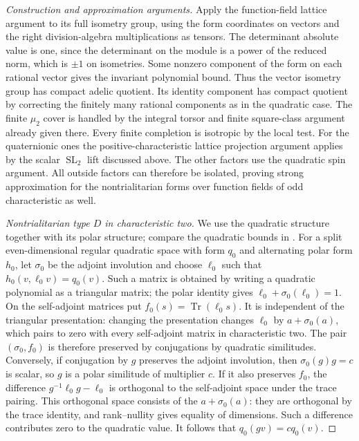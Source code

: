 \documentclass[11pt,a4paper,openany,oneside]{book}
\theoremstyle{resultstyle}
\theoremstyle{definition}
\numberwithin{equation}{chapter}
\begin{document}
\begin{proof}[Construction and approximation arguments]
Apply the function-field lattice
argument to its full isometry
group, using the form coordinates
on vectors and the right
division-algebra multiplications
as tensors. The determinant
absolute value is one, since
the determinant on the module
is a power of the reduced norm,
which is \(\pm1\) on isometries.
Some nonzero component of the
form on each rational vector
gives the invariant polynomial
bound. Thus the vector isometry
group has compact adelic quotient.
Its identity component has
compact quotient by correcting
the finitely many rational
components as in the quadratic
case. The finite \(\mu_2\)
cover is handled by the integral
torsor and finite square-class
argument already given there.
Every finite completion is
isotropic by the local test.
For the quaternionic ones
the positive-characteristic
lattice projection argument
applies by the scalar
\(\operatorname{SL}_2\) lift discussed
above. The other factors use
the quadratic spin argument.
All outside factors can
therefore be isolated, proving
strong approximation for the
nontrialitarian forms over
function fields of odd
characteristic as well.

\medskip\noindent
\textit{Nontrialitarian type \(D\) in characteristic two.}
We use the quadratic structure together with its polar structure;
compare the quadratic bounds in \cite[Corollary 6.8]{dolphinquadratic}. For a split
even-dimensional regular quadratic space with form \(q_0\) and alternating
polar form \(h_0\), let \(\sigma_0\) be the adjoint involution and choose
\(\ell_0\) such that \(h_0(v,\ell_0 v)=q_0(v)\). Such a matrix is obtained
by writing a quadratic polynomial as a triangular matrix; the
polar identity gives \(\ell_0+\sigma_0(\ell_0)=1\). On the
self-adjoint matrices put \(f_0(s)=\operatorname{Tr}(\ell_0s)\).
It is independent of the triangular presentation: changing the
presentation changes \(\ell_0\) by \(a+\sigma_0(a)\), which pairs
to zero with every self-adjoint matrix in characteristic two.
The pair \((\sigma_0,f_0)\) is therefore preserved by conjugations
by quadratic similitudes. Conversely, if conjugation by \(g\)
preserves the adjoint involution, then \(\sigma_0(g)g=c\) is
scalar, so \(g\) is a polar similitude of multiplier \(c\).
If it also preserves \(f_0\), the difference
\(g^{-1}\ell_0g-\ell_0\) is orthogonal to the self-adjoint space
under the trace pairing. This orthogonal space consists of
the \(a+\sigma_0(a)\): they are orthogonal by the trace
identity, and rank--nullity gives equality of dimensions.
Such a difference contributes zero to the quadratic value.
It follows that \(q_0(gv)=c q_0(v)\).


\end{proof}
\end{document}
